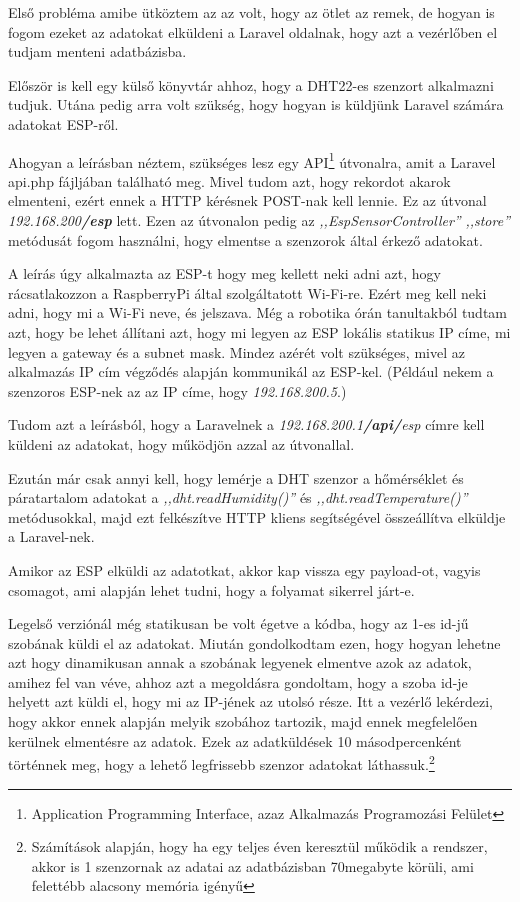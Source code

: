 \documentclass[
]{thesis-ekf}
\theoremstyle{definition}
\theoremstyle{remark}
\begin{document}
	Első probléma amibe ütköztem az az volt, hogy az ötlet az remek, de hogyan is fogom ezeket az adatokat elküldeni a Laravel oldalnak, hogy azt a vezérlőben el tudjam menteni adatbázisba.
	
	Először is kell egy külső könyvtár ahhoz, hogy a DHT22-es szenzort alkalmazni tudjuk.\cite{adafruit-dht-library} Utána pedig arra volt szükség, hogy hogyan is küldjünk Laravel számára adatokat ESP-ről.\cite{arduino-to-laravel}
	
	Ahogyan a leírásban néztem, szükséges lesz egy API\footnote{Application Programming Interface, azaz Alkalmazás Programozási Felület} útvonalra, amit a Laravel api.php fájljában található meg. Mivel tudom azt, hogy rekordot akarok elmenteni, ezért ennek a HTTP kérésnek POST-nak kell lennie. Ez az útvonal \emph{192.168.200\textbf{/esp}} lett. Ezen az útvonalon pedig az \emph{,,EspSensorController''} \emph{,,store''} metódusát fogom használni, hogy elmentse a szenzorok által érkező adatokat. 
	
	A leírás úgy alkalmazta az ESP-t hogy meg kellett neki adni azt, hogy rácsatlakozzon a RaspberryPi által szolgáltatott Wi-Fi-re. Ezért meg kell neki adni, hogy mi a Wi-Fi neve, és jelszava. Még a robotika órán tanultakból tudtam azt, hogy be lehet állítani azt, hogy mi legyen az ESP lokális statikus IP címe, mi legyen a gateway és a subnet mask. Mindez azérét volt szükséges, mivel az alkalmazás IP cím végződés alapján kommunikál az ESP-kel. (Például nekem a szenzoros ESP-nek az az IP címe, hogy \emph{192.168.200.5}.)
	
	Tudom azt a leírásból, hogy a Laravelnek a \emph{192.168.200.1\textbf{/api/}esp} címre kell küldeni az adatokat, hogy működjön azzal az útvonallal. 
	
	Ezután már csak annyi kell, hogy lemérje a DHT szenzor a hőmérséklet és páratartalom adatokat a \emph{,,dht.readHumidity()''} és \emph{,,dht.readTemperature()''} metódusokkal, majd ezt felkészítve HTTP kliens segítségével összeállítva elküldje a Laravel-nek.
	
	Amikor az ESP elküldi az adatotkat, akkor kap vissza egy payload-ot, vagyis csomagot, ami alapján lehet tudni, hogy a folyamat sikerrel járt-e.
	
	Legelső verziónál még statikusan be volt égetve a kódba, hogy az 1-es id-jű szobának küldi el az adatokat. Miután gondolkodtam ezen, hogy hogyan lehetne azt hogy dinamikusan annak a szobának legyenek elmentve azok az adatok, amihez fel van véve, ahhoz azt a megoldásra gondoltam, hogy a szoba id-je helyett azt küldi el, hogy mi az IP-jének az utolsó része. Itt a vezérlő lekérdezi, hogy akkor ennek alapján melyik szobához tartozik, majd ennek megfelelően kerülnek elmentésre az adatok. Ezek az adatküldések 10 másodpercenként történnek meg, hogy a lehető legfrissebb szenzor adatokat láthassuk.\footnote{Számítások alapján, hogy ha egy teljes éven keresztül működik a rendszer, akkor is 1 szenzornak az adatai az adatbázisban 70megabyte körüli, ami felettébb alacsony memória igényű}
	
\end{document}
